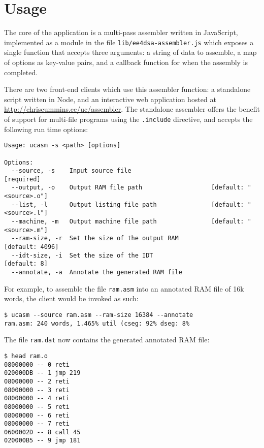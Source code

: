 \documentclass[12pt,twoside]{report}
\begin{document}
\newpage
\section{Usage}

The core of the application is a multi-pass assembler written in
JavaScript, implemented as a module in the file
\texttt{lib/ee4dsa-assembler.js} which exposes a single function that
accepts three arguments: a string of data to assemble, a map of
options as key-value pairs, and a callback function for when the
assembly is completed.

There are two front-end clients which use this assembler function: a
standalone script written in Node, and an interactive web application
hosted at \url{http://chriscummins.cc/uc/assembler}. The standalone
assembler offers the benefit of support for multi-file programs using
the \texttt{.include} directive, and accepts the following run time
options:

\begin{verbatim}
Usage: ucasm -s <path> [options]

Options:
  --source, -s    Input source file                                   [required]
  --output, -o    Output RAM file path                   [default: "<source>.o"]
  --list, -l      Output listing file path               [default: "<source>.l"]
  --machine, -m   Output machine file path               [default: "<source>.m"]
  --ram-size, -r  Set the size of the output RAM                 [default: 4096]
  --idt-size, -i  Set the size of the IDT                           [default: 8]
  --annotate, -a  Annotate the generated RAM file
\end{verbatim}

For example, to assemble the file \texttt{ram.asm} into an annotated
RAM file of 16k words, the client would be invoked as such:

\begin{verbatim}
$ ucasm --source ram.asm --ram-size 16384 --annotate
ram.asm: 240 words, 1.465% util (cseg: 92% dseg: 8%
\end{verbatim}

The file \texttt{ram.dat} now contains the generated annotated RAM
file:

\begin{verbatim}
$ head ram.o
08000000 -- 0 reti
020000DB -- 1 jmp 219
08000000 -- 2 reti
08000000 -- 3 reti
08000000 -- 4 reti
08000000 -- 5 reti
08000000 -- 6 reti
08000000 -- 7 reti
0600002D -- 8 call 45
020000B5 -- 9 jmp 181
\end{verbatim}
\end{document}

